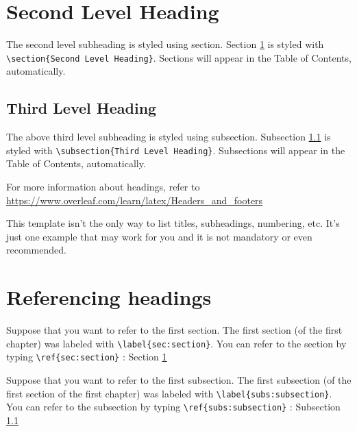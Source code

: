 \documentclass{report}
\begin{document}
\section{Second Level Heading}\label{sec:section}
The second level subheading is styled using section.
Section \ref{sec:section} is styled with \verb|\section{Second Level Heading}|.
Sections will appear in the Table of Contents, automatically.

%
\subsection{Third Level Heading}\label{subs:subsection}
The above third level subheading is styled using subsection.
Subsection \ref{subs:subsection} is styled with \verb|\subsection{Third Level Heading}|.
Subsections will appear in the Table of Contents, automatically.

For more information about headings, refer to \url{https://www.overleaf.com/learn/latex/Headers_and_footers}

This template isn’t the only way to list titles, subheadings, numbering, etc.
It’s just one example that may work for you and it is not mandatory or even recommended.

%
\section{Referencing headings}\label{sec:referencing}
Suppose that you want to refer to the first section.
The first section (of the first chapter) was labeled with \verb|\label{sec:section}|.
You can refer to the section by typing \verb|\ref{sec:section}| : Section \ref{sec:section}

Suppose that you want to refer to the first subsection.
The first subsection (of the first section of the first chapter) was labeled with \verb|\label{subs:subsection}|.
You can refer to the subsection by typing \verb|\ref{subs:subsection}| : Subsection \ref{subs:subsection}
\end{document}

